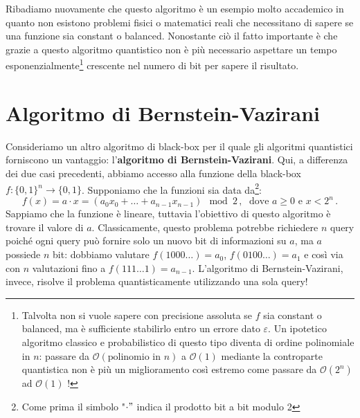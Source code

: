 \noindent Ribadiamo nuovamente che questo algoritmo è un esempio molto accademico in quanto non esistono problemi fisici o matematici reali che necessitano di sapere se una funzione sia constant o balanced. Nonostante ciò il fatto importante è che grazie a questo algoritmo quantistico non è più necessario aspettare un tempo esponenzialmente\footnote{Talvolta non si vuole sapere con precisione assoluta se $f$ sia constant o balanced, ma è sufficiente stabilirlo entro un errore dato $\varepsilon$. Un ipotetico algoritmo classico e probabilistico di questo tipo diventa di ordine polinomiale in $n$: passare da $\mathcal{O}(\text{polinomio in }n)$ a $\mathcal{O}(1)$ mediante la controparte quantistica non è più un miglioramento così estremo come passare da $\mathcal{O}(2^n)$ ad $\mathcal{O}(1)$ !} crescente nel numero di bit per sapere il risultato. 

\section{Algoritmo di Bernstein-Vazirani}
Consideriamo un altro algoritmo di black-box per il quale gli algoritmi quantistici forniscono un vantaggio: l'\textbf{algoritmo di Bernstein-Vazirani}. Qui, a differenza dei due casi precedenti, abbiamo accesso alla funzione della black-box $f: \{0, 1\}^n \rightarrow \{0, 1\}$. Supponiamo che la funzioni sia data da\footnote{Come prima il simbolo "$\cdot"$ indica il prodotto bit a bit modulo 2}:
\begin{equation*}
    f(x) = a\cdot x = (a_0 x_0 + \ldots + a_{n-1} x_{n-1})\mod{2} \, , \; \text{ dove } a \geqslant 0 \text{ e } x < 2^n \, .
\end{equation*}
Sappiamo che la funzione è lineare, tuttavia l'obiettivo di questo algoritmo è trovare il valore di $a$. Classicamente, questo problema potrebbe richiedere $n$ query poiché ogni query può fornire solo un nuovo bit di informazioni su $a$, ma $a$ possiede $n$ bit: dobbiamo valutare $f(1000\ldots) = a_0$, $f(0100\ldots) = a_1$ e così via con $n$ valutazioni fino a $f(111\ldots1) = a_{n-1}$. L'algoritmo di Bernstein-Vazirani, invece, risolve il problema quantisticamente utilizzando una sola query!

